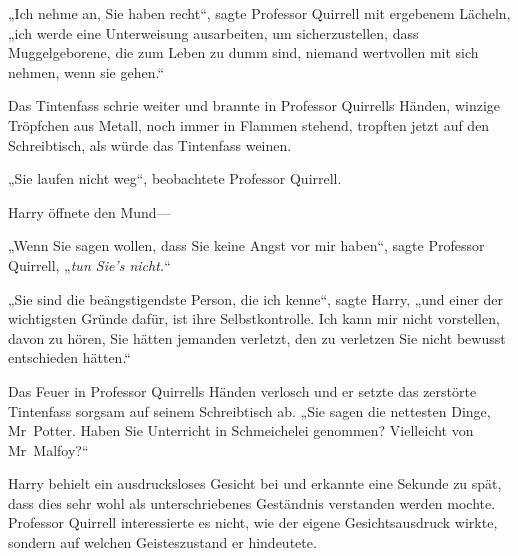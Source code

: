 „Ich nehme an, Sie haben recht“, sagte Professor Quirrell mit ergebenem Lächeln, „ich werde eine Unterweisung ausarbeiten, um sicherzustellen, dass Muggelgeborene, die zum Leben zu dumm sind, niemand wertvollen mit sich nehmen, wenn sie gehen.“

Das Tintenfass schrie weiter und brannte in Professor Quirrells Händen, winzige Tröpfchen aus Metall, noch immer in Flammen stehend, tropften jetzt auf den Schreibtisch, als würde das Tintenfass weinen.

„Sie laufen nicht weg“, beobachtete Professor Quirrell.

Harry öffnete den Mund—

„Wenn Sie sagen wollen, dass Sie keine Angst vor mir haben“, sagte Professor Quirrell, „\emph{tun Sie’s nicht.}“

„Sie sind die beängstigendste Person, die ich kenne“, sagte Harry, „und einer der wichtigsten Gründe dafür, ist ihre Selbstkontrolle. Ich kann mir nicht vorstellen, davon zu hören, Sie hätten jemanden verletzt, den zu verletzen Sie nicht bewusst entschieden hätten.“

Das Feuer in Professor Quirrells Händen verlosch und er setzte das zerstörte Tintenfass sorgsam auf seinem Schreibtisch ab. „Sie sagen die nettesten Dinge, Mr~Potter. Haben Sie Unterricht in Schmeichelei genommen? Vielleicht von Mr~Malfoy?“

Harry behielt ein ausdrucksloses Gesicht bei und erkannte eine Sekunde zu spät, dass dies sehr wohl als unterschriebenes Geständnis verstanden werden mochte. Professor Quirrell interessierte es nicht, wie der eigene Gesichtsausdruck wirkte, sondern auf welchen Geisteszustand er hindeutete.


